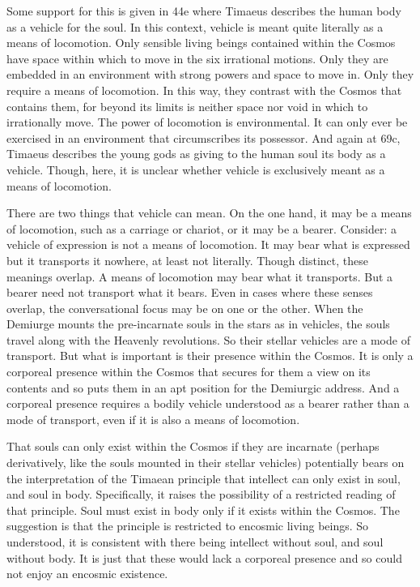 Some support for this is given in 44e where Timaeus describes the human body as a vehicle for the soul. In this context, vehicle is meant quite literally as a means of locomotion. Only sensible living beings contained within the Cosmos have space within which to move in the six irrational motions. Only they are embedded in an environment with strong powers and space to move in. Only they require a means of locomotion. In this way, they contrast with the Cosmos that contains them, for beyond its limits is neither space nor void in which to irrationally move. The power of locomotion is environmental. It can only ever be exercised in an environment that circumscribes its possessor. And again at 69c, Timaeus describes the young gods as giving to the human soul its body as a vehicle. Though, here, it is unclear whether vehicle is exclusively meant as a means of locomotion.

There are two things that vehicle can mean. On the one hand, it may be a means of locomotion, such as a carriage or chariot, or it may be a bearer. Consider: a vehicle of expression is not a means of locomotion. It may bear what is expressed but it transports it nowhere, at least not literally. Though distinct, these meanings overlap. A means of locomotion may bear what it transports. But a bearer need not transport what it bears. Even in cases where these senses overlap, the conversational focus may be on one or the other. When the Demiurge mounts the pre-incarnate souls in the stars as in vehicles, the souls travel along with the Heavenly revolutions. So their stellar vehicles are a mode of transport. But what is important is their presence within the Cosmos. It is only a corporeal presence within the Cosmos that secures for them a view on its contents and so puts them in an apt position for the Demiurgic address. And a corporeal presence requires a bodily vehicle understood as a bearer rather than a mode of transport, even if it is also a means of locomotion.

That souls can only exist within the Cosmos if they are incarnate (perhaps derivatively, like the souls mounted in their stellar vehicles) potentially bears on the interpretation of the Timaean principle that intellect can only exist in soul, and soul in body. Specifically, it raises the possibility of a restricted reading of that principle. Soul must exist in body only if it exists within the Cosmos. The suggestion is that the principle is restricted to encosmic living beings. So understood, it is consistent with there being intellect without soul, and soul without body. It is just that these would lack a corporeal presence and so could not enjoy an encosmic existence. 

